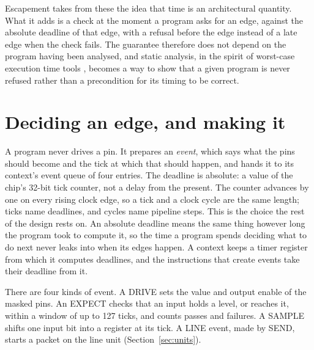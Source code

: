 \documentclass[conference,letterpaper]{IEEEtran}
\begin{document}
Escapement takes from these the idea that time is an architectural quantity. What it
adds is a check at the moment a program asks for an edge, against the absolute deadline
of that edge, with a refusal before the edge instead of a late edge when the check fails. The guarantee
therefore does not depend on the program having been analysed, and static analysis, in
the spirit of worst-case execution time tools \cite{wcet}, becomes a way to show that a
given program is never refused rather than a precondition for its timing to be correct.

\section{Deciding an edge, and making it}
\label{sec:events}

A program never drives a pin. It prepares an \emph{event}, which says what the pins
should become and the tick at which that should happen, and hands it to its context's
event queue of four entries. The deadline is absolute: a value of the chip's 32-bit tick
counter, not a delay from the present. The counter advances by one on every rising clock
edge, so a tick and a clock cycle are the same length; ticks name deadlines, and cycles
name pipeline steps. This is the choice the rest of the design rests
on. An absolute deadline means the same thing however long the program took to compute
it, so the time a program spends deciding what to do next never leaks into when its edges
happen. A context keeps a timer register from which it computes deadlines, and the
instructions that create events take their deadline from it.

There are four kinds of event. A DRIVE sets the value and output enable of the masked
pins. An EXPECT checks that an input holds a level, or reaches it, within a window of up
to 127 ticks, and counts passes and failures. A SAMPLE shifts one input bit into a
register at its tick. A LINE event, made by SEND, starts a packet on the line unit
(Section~\ref{sec:units}).
\end{document}
